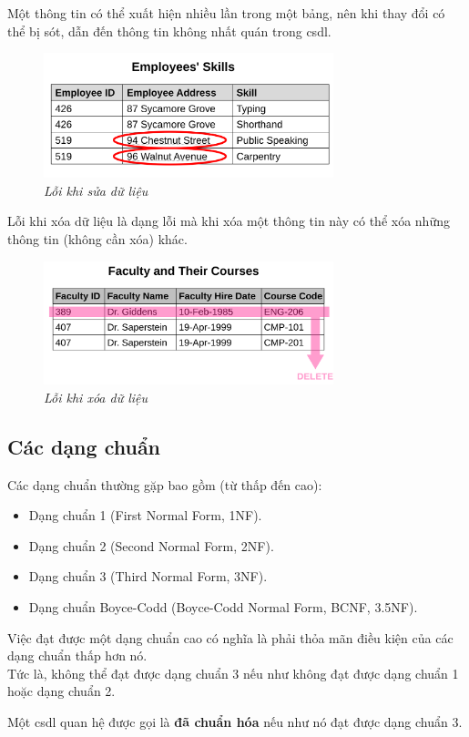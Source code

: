 \documentclass[11pt]{beamer}
\begin{document}
\begin{frame}
  Một thông tin có thể xuất hiện nhiều lần trong một bảng, nên khi thay đổi có thể bị sót, 
  dẫn đến thông tin không nhất quán trong csdl.
  \begin{figure}
    \includegraphics[width=0.75\textwidth]{COS212/ua.png}
    \caption{\textit{Lỗi khi sửa dữ liệu}}
  \end{figure}
\end{frame}

\begin{frame}
  Lỗi khi xóa dữ liệu là dạng lỗi mà khi xóa một thông tin này có thể xóa những 
  thông tin (không cần xóa) khác.
  \begin{figure}
    \includegraphics[width=0.75\textwidth]{COS212/da.png}
    \caption{\textit{Lỗi khi xóa dữ liệu}}
  \end{figure}
\end{frame}

\subsection{Các dạng chuẩn}
\begin{frame}
  Các dạng chuẩn thường gặp bao gồm (từ thấp đến cao):
  \begin{itemize}
    \item Dạng chuẩn 1 (First Normal Form, 1NF).
    \item Dạng chuẩn 2 (Second Normal Form, 2NF).
    \item Dạng chuẩn 3 (Third Normal Form, 3NF).
    \item Dạng chuẩn Boyce-Codd (Boyce-Codd Normal Form, BCNF, 3.5NF). 
  \end{itemize}
\end{frame}

\begin{frame}
  Việc đạt được một dạng chuẩn cao có nghĩa là phải thỏa mãn điều kiện của các dạng chuẩn thấp hơn nó.\\
  Tức là, không thể đạt được dạng chuẩn 3 nếu như không đạt được dạng chuẩn 1 hoặc dạng chuẩn 2.
\end{frame}

\begin{frame}
  Một csdl quan hệ được gọi là \textbf{đã chuẩn hóa} nếu như nó đạt được dạng chuẩn 3.
\end{frame}
\end{document}
